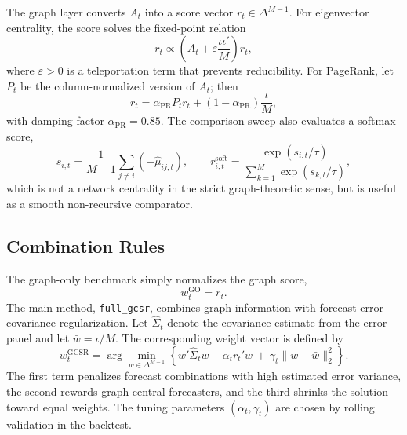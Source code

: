 \documentclass[11pt,a4paper]{article}
\newcommand{\simplex}{\Delta^{M-1}}
\begin{document}
The graph layer converts $A_t$ into a score vector $r_t \in \simplex$. For eigenvector centrality, the score solves the fixed-point relation
\begin{equation}
r_t \propto \left(A_t + \varepsilon \frac{\iota\iota'}{M}\right) r_t,
\end{equation}
where $\varepsilon>0$ is a teleportation term that prevents reducibility. For PageRank, let $P_t$ be the column-normalized version of $A_t$; then
\begin{equation}
r_t = \alpha_{\mathrm{PR}} P_t r_t + (1-\alpha_{\mathrm{PR}})\frac{\iota}{M},
\end{equation}
with damping factor $\alpha_{\mathrm{PR}}=0.85$. The comparison sweep also evaluates a softmax score,
\begin{equation}
s_{i,t} = \frac{1}{M-1}\sum_{j \neq i} \left(-\widehat{\mu}_{ij,t}\right),
\qquad
r_{i,t}^{\mathrm{soft}} = \frac{\exp(s_{i,t}/\tau)}{\sum_{k=1}^M \exp(s_{k,t}/\tau)},
\end{equation}
which is not a network centrality in the strict graph-theoretic sense, but is useful as a smooth non-recursive comparator.

\subsection{Combination Rules}

The graph-only benchmark simply normalizes the graph score,
\begin{equation}
w_t^{\mathrm{GO}} = r_t.
\end{equation}
The main method, \texttt{full\_gcsr}, combines graph information with forecast-error covariance regularization. Let $\widehat{\Sigma}_t$ denote the covariance estimate from the error panel and let $\bar{w}=\iota/M$. The corresponding weight vector is defined by
\begin{equation}
w_t^{\mathrm{GCSR}}
=
\arg\min_{w \in \simplex}
\left\{
w'\widehat{\Sigma}_t w
- \alpha_t r_t' w
\,+\, \gamma_t \lVert w-\bar{w}\rVert_2^2
\right\}.
\end{equation}
The first term penalizes forecast combinations with high estimated error variance, the second rewards graph-central forecasters, and the third shrinks the solution toward equal weights. The tuning parameters $(\alpha_t,\gamma_t)$ are chosen by rolling validation in the backtest.
\end{document}
